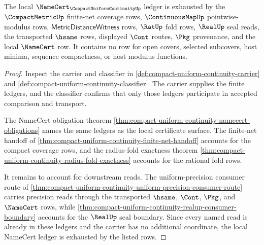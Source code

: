 \begin{theorem}
\label{thm:compact-uniform-continuity-namecert-ledger-exhaustion}
The local $\NameCert_{\CompactUniformContinuityUp}$ ledger is exhausted by the $\CompactMetricUp$ finite-net coverage rows, $\ContinuousMapUp$ pointwise-modulus rows, $\mathsf{MetricDistanceWitness}$ rows, $\RatUp$ fold rows, $\RealUp$ seal reads, the transported $\hsame$ rows, displayed $\Cont$ routes, $\Pkg$ provenance, and the local $\NameCert$ row. It contains no row for open covers, selected subcovers, host minima, sequence compactness, or host modulus functions.
\end{theorem}
\begin{proof}
Inspect the carrier and classifier in \autoref{def:compact-uniform-continuity-carrier} and \autoref{def:compact-uniform-continuity-classifier}. The carrier supplies the finite ledgers, and the classifier confirms that only those ledgers participate in accepted comparison and transport.

The NameCert obligation theorem \autoref{thm:compact-uniform-continuity-namecert-obligations} names the same ledgers as the local certificate surface. The finite-net handoff of \autoref{thm:compact-uniform-continuity-finite-net-handoff} accounts for the compact coverage rows, and the radius-fold exactness theorem \autoref{thm:compact-uniform-continuity-radius-fold-exactness} accounts for the rational fold rows.

It remains to account for downstream reads. The uniform-precision consumer route of \autoref{thm:compact-uniform-continuity-uniform-precision-consumer-route} carries precision reads through the transported $\hsame$, $\Cont$, $\Pkg$, and $\NameCert$ rows, while \autoref{thm:compact-uniform-continuity-realup-consumer-boundary} accounts for the $\RealUp$ seal boundary. Since every named read is already in these ledgers and the carrier has no additional coordinate, the local NameCert ledger is exhausted by the listed rows.
\end{proof}

